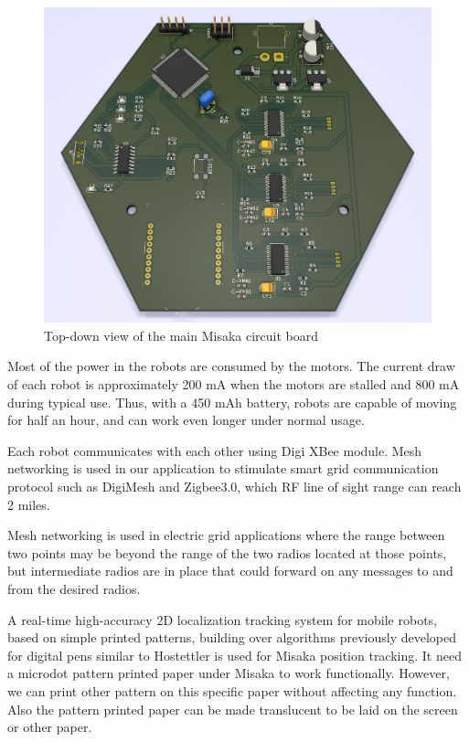 \documentclass[conference]{IEEEtran}
\begin{document}
\begin{figure}[htbp]
    \centering
    \includegraphics[width=0.6\columnwidth]{PCB.png}
    \caption{Top-down view of the main Misaka circuit board}
    \label{fig:PCB}
\end{figure}

Most of the power in the robots are consumed by the motors. The current draw of each robot is approximately 200 mA when the motors are stalled and 800 mA during typical use. Thus, with a 450 mAh battery, robots are capable of moving for half an hour, and can work even longer under normal usage.

Each robot communicates with each other using Digi XBee module. Mesh networking is used in our application to stimulate smart grid communication protocol such as DigiMesh and Zigbee3.0, which RF line of sight range can reach 2 miles.

Mesh networking is used in electric grid applications where the range between two points may be beyond the range of the two radios located at those points, but intermediate radios are in place that could forward on any messages to and from the desired radios.



A real-time high-accuracy 2D localization tracking system for mobile robots, based on simple printed patterns, building over algorithms previously developed for digital pens similar to Hostettler\cite{hostettler2016real} is used
for Misaka position tracking. It need a microdot pattern printed paper under Misaka to work functionally. However, we can print other pattern on this specific paper without affecting any function. Also the pattern printed paper can be made translucent to be laid on the screen or other paper.
\end{document}
